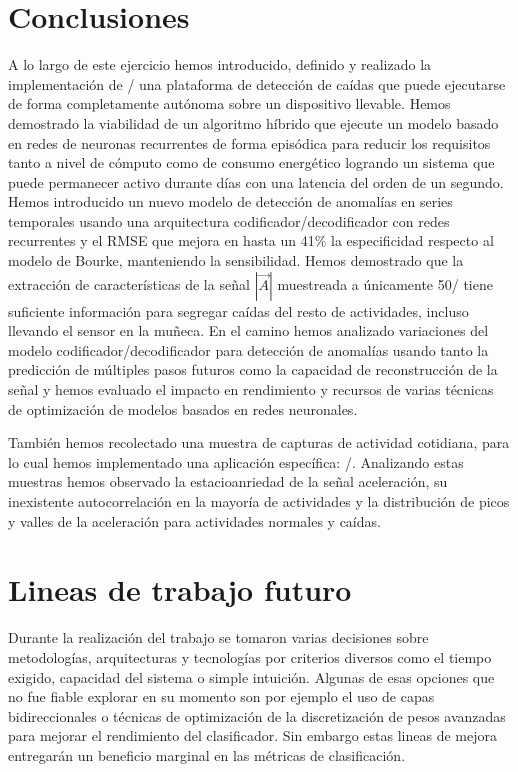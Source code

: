
\section{Conclusiones}

A lo largo de este ejercicio hemos introducido, definido y realizado la implementación de \ifell/ una plataforma de detección de caídas que puede ejecutarse de forma completamente autónoma sobre un dispositivo llevable. Hemos demostrado la viabilidad de un algoritmo híbrido que ejecute un modelo basado en redes de neuronas recurrentes de forma episódica para reducir los requisitos tanto a nivel de cómputo como de consumo energético logrando un sistema que puede permanecer activo durante días con una latencia del orden de un segundo. Hemos introducido un nuevo modelo de detección de anomalías en series temporales usando una arquitectura codificador/decodificador con redes recurrentes y el RMSE que mejora en hasta un 41\% la especificidad respecto al modelo de Bourke, manteniendo la sensibilidad. Hemos demostrado que la extracción de características de la señal $|\vec{A}|$ muestreada a únicamente 50\hz/ tiene suficiente información para segregar caídas del resto de actividades, incluso llevando el sensor en la muñeca. En el camino hemos analizado variaciones del modelo codificador/decodificador para detección de anomalías usando tanto la predicción de múltiples pasos futuros como la capacidad de reconstrucción de la señal y hemos evaluado el impacto en rendimiento y recursos de varias técnicas de optimización de modelos basados en redes neuronales.

También hemos recolectado una muestra de capturas de actividad cotidiana, para lo cual hemos implementado una aplicación específica: \accelcapture/. Analizando estas muestras hemos observado la estacioanriedad de la señal aceleración, su inexistente autocorrelación en la mayoría de actividades y la distribución de picos y valles de la aceleración para actividades normales y caídas.

\section{Lineas de trabajo futuro}

Durante la realización del trabajo se tomaron varias decisiones sobre metodologías, arquitecturas y tecnologías por criterios diversos como el tiempo exigido, capacidad del sistema o simple intuición. Algunas de esas opciones que no fue fiable explorar en su momento son por ejemplo el uso de capas bidireccionales o técnicas de optimización de la discretización de pesos avanzadas para mejorar el rendimiento del clasificador. Sin embargo estas lineas de mejora entregarán un beneficio marginal en las métricas de clasificación.

